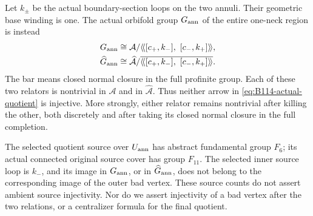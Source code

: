 Let $k_\pm$ be the actual boundary-section loops on the two annuli.
Their geometric base winding is one. The actual orbifold group
$G_{\rm ann}$ of the entire one-neck region is instead
\begin{equation}\label{eq:B114-actual-quotient}
 \begin{split}
 G_{\rm ann}&\cong
 \mathcal A/\langle\!\langle
       [c_+,k_-],\ [c_-,k_+]\rangle\!\rangle,\\
 \widehat G_{\rm ann}&\cong
 \widehat{\mathcal A}/
 \overline{\langle\!\langle[c_+,k_-],\ [c_-,k_+]\rangle\!\rangle}.
 \end{split}
\end{equation}
The bar means closed normal closure in the full profinite group.
Each of these two relators is nontrivial in $\mathcal A$ and in
$\widehat{\mathcal A}$. Thus neither arrow in
\eqref{eq:B114-actual-quotient} is injective. More strongly, either
relator remains nontrivial after killing the other, both discretely
and after taking its closed normal closure in the full completion.

The selected quotient source over $U_{\rm ann}$ has abstract
fundamental group $F_6$; its actual connected original source cover
has group $F_{11}$. The selected inner source loop is $k_-$, and
its image in $G_{\rm ann}$, or in $\widehat G_{\rm ann}$, does not
belong to the corresponding image of the outer bad vertex.
These source counts do not assert ambient source injectivity.
Nor do we assert injectivity of a bad vertex after the two
relations, or a centralizer formula for the final quotient.

